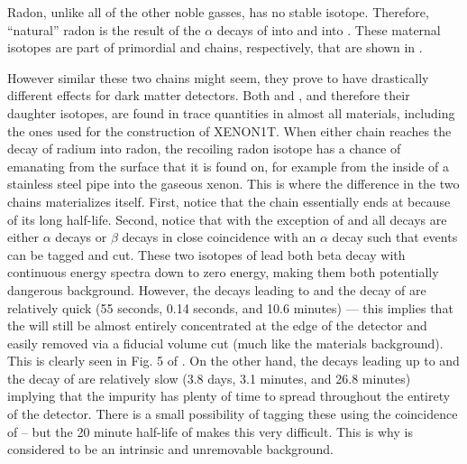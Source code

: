 Radon, unlike all of the other noble gasses, has no stable isotope.  Therefore, ``natural'' radon is the result of the $\alpha$ decays of  into \radon{} and  into .  These maternal isotopes are part of primordial  and  chains, respectively, that are shown in .  

However similar these two chains might seem, they prove to have drastically different effects for dark matter detectors.  Both \uranium{} and \thorium{}, and therefore their daughter isotopes, are found in trace quantities in almost all materials, including the ones used for the construction of XENON1T.  When either chain reaches the decay of radium into radon, the recoiling radon isotope has a chance of emanating from the surface that it is found on, for example from the inside of a stainless steel pipe into the gaseous xenon.  This is where the difference in the two chains materializes itself.  First, notice that the \uranium{} chain essentially ends at  because of its long half-life.  Second, notice that with the exception of  and  all decays are either $\alpha$ decays or $\beta$ decays in close coincidence with an $\alpha$ decay such that events can be tagged and cut.  These two isotopes of lead both beta decay with continuous energy spectra down to zero energy, making them both potentially dangerous background.  However, the decays leading to and the decay of  are relatively quick (55 seconds, 0.14 seconds, and 10.6 minutes) --- this implies that the  will still be almost entirely concentrated at the edge of the detector and easily removed via a fiducial volume cut (much like the materials background).  This is clearly seen in Fig. 5 of .  On the other hand, the decays leading up to and the decay of  are relatively slow (3.8 days, 3.1 minutes, and 26.8 minutes) implying that the impurity has plenty of time to spread throughout the entirety of the detector.  There is a small possibility of tagging these  using the coincidence of -- but the 20 minute half-life of  makes this very difficult.  This is why \radon{} is considered to be an intrinsic and unremovable background.

